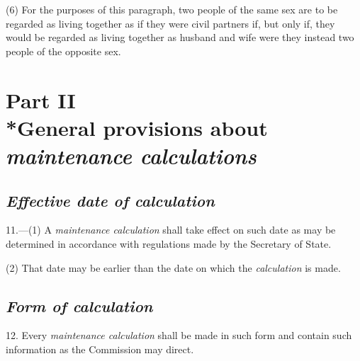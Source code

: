 \documentclass[12pt,a4paper]{article}
\begin{document}
(6) For the purposes of this paragraph, two people of the same sex are to be regarded as living together as if they were civil partners if, but only if, they would be regarded as living together as husband and wife were they instead two people of the opposite sex.


\section[Part II --- General provisions about 
\emph{maintenance calculations}  %
]{Part II\\*General provisions about 
\emph{maintenance calculations}  %
}

\renewcommand\parthead{--- Schedule 1 Part II}

\subsection*{\itshape Effective date of 
\emph{calculation}  %
}

11.---(1) A 
\emph{maintenance calculation}  %
shall take effect on such date as may be determined in accordance with regulations made by the Secretary of State.

(2) That date may be earlier than the date on which the 
\emph{calculation}  %
is made.


\subsection*{\itshape Form of 
\emph{calculation}  %
}

12. Every 
\emph{maintenance calculation}  %
shall be made in such form and contain such information as the 
Commission  %
may direct.
\end{document}
